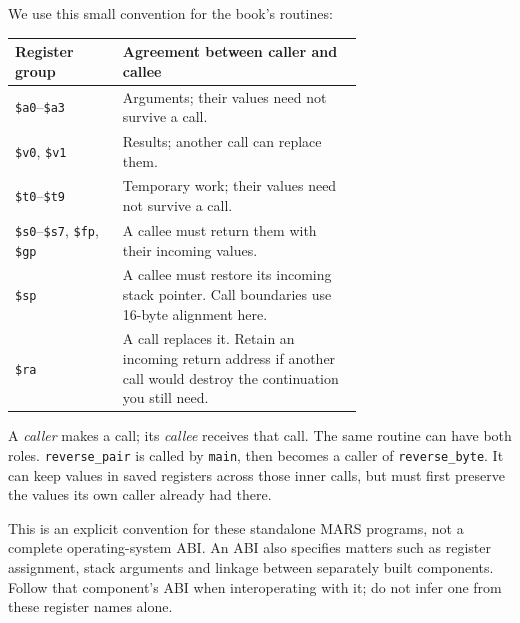 We use this small convention for the book's routines:

\begin{center}
  \begin{tabular}{lp{0.69\linewidth}}
    \toprule
    Register group                                             & Agreement between caller and callee                                                                                  \\
    \midrule
    \texttt{\$a0}--\texttt{\$a3}                               & Arguments; their values need not survive a call.                                                                     \\
    \texttt{\$v0}, \texttt{\$v1}                               & Results; another call can replace them.                                                                              \\
    \texttt{\$t0}--\texttt{\$t9}                               & Temporary work; their values need not survive a call.                                                                \\
    \texttt{\$s0}--\texttt{\$s7}, \texttt{\$fp}, \texttt{\$gp} & A callee must return them with their incoming values.                                                                \\
    \texttt{\$sp}                                              & A callee must restore its incoming stack pointer. Call boundaries use 16-byte alignment here.                        \\
    \texttt{\$ra}                                              & A call replaces it. Retain an incoming return address if another call would destroy the continuation you still need. \\
    \bottomrule
  \end{tabular}
\end{center}

A \emph{caller} makes a call; its \emph{callee} receives that call. The same
routine can have both roles. \texttt{reverse\_pair} is called by \texttt{main},
then becomes a caller of \texttt{reverse\_byte}. It can keep values in saved
registers across those inner calls, but must first preserve the values its own
caller already had there.

This is an explicit convention for these standalone MARS programs, not a complete
operating-system ABI. An ABI also specifies matters such as register assignment,
stack arguments and linkage between separately built components. Follow that
component's ABI when interoperating with it; do not infer one from these register
names alone.

